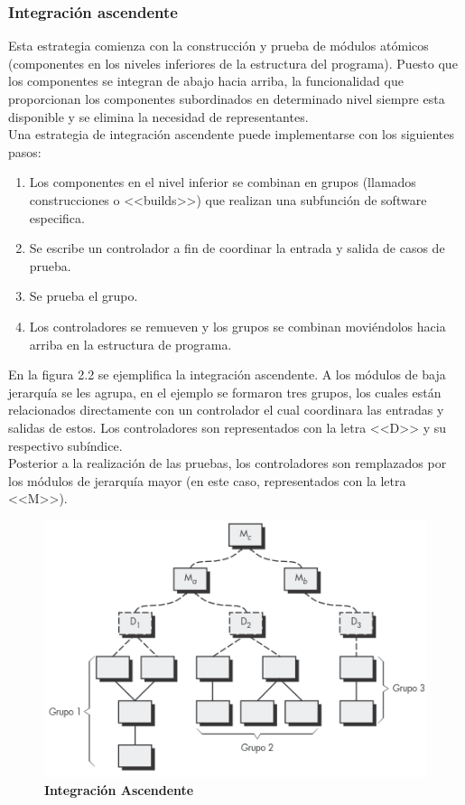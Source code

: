 \subsubsection{Integración ascendente}
Esta estrategia comienza con la construcción y prueba de módulos atómicos (componentes en los niveles inferiores de la estructura del programa). Puesto que los componentes se integran de abajo hacia arriba, la funcionalidad que proporcionan los componentes subordinados en determinado nivel siempre esta disponible y se elimina la necesidad de representantes.\\
Una estrategia de integración ascendente puede implementarse con los siguientes pasos:
\begin{enumerate}
	\item Los componentes en el nivel inferior se combinan en grupos (llamados construcciones o <<builds>>) que realizan una subfunción de software especifica.
	\item Se escribe un controlador a fin de coordinar la entrada y salida de casos de prueba.
	\item Se prueba el grupo.
	\item Los controladores se remueven y los grupos se combinan moviéndolos hacia arriba en la estructura de programa.
\end{enumerate}
En la figura 2.2 se ejemplifica la integración ascendente. A los módulos de baja jerarquía se les agrupa, en el ejemplo se formaron tres grupos, los cuales están relacionados directamente con un controlador el cual coordinara las entradas y salidas de estos. Los controladores son representados con la letra <<D>> y su respectivo subíndice.\\
Posterior a la realización de las pruebas, los controladores son remplazados por los módulos de jerarquía mayor (en este caso, representados con la letra <<M>>).
\begin{figure}[H]
	\centering
	\includegraphics[scale=1]{project/images/integracion.png}
	\caption{\textbf{Integración Ascendente}}
\end{figure}

